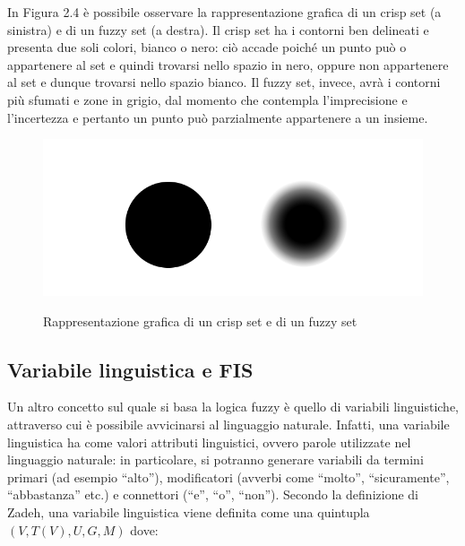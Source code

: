\documentclass[11pt,  oneside, openany]{book}
\begin{document}
In Figura 2.4 è possibile osservare la rappresentazione grafica di un crisp set (a sinistra) e di un fuzzy set (a destra). Il crisp set ha i contorni ben delineati e presenta due soli colori, bianco o nero: ciò accade poiché un punto può o appartenere al set e quindi trovarsi nello spazio in nero, oppure non appartenere al set e dunque trovarsi nello spazio bianco. Il fuzzy set, invece, avrà i contorni più sfumati e zone in grigio, dal momento che contempla l'imprecisione e l'incertezza e pertanto un punto può parzialmente appartenere a un insieme. 

\begin{figure}[h!]
\begin{center}
  \includegraphics[width=13cm]{Immagini/fuzzyvscrisp.png}\\
  \caption{Rappresentazione grafica di un crisp set e di un fuzzy set}
\end{center}
\end{figure}



\subsection{Variabile linguistica e FIS}


Un altro concetto sul quale si basa la logica fuzzy è quello di variabili linguistiche, attraverso cui è possibile avvicinarsi al linguaggio naturale. Infatti, una variabile linguistica ha come valori attributi linguistici, ovvero parole utilizzate nel linguaggio naturale: in particolare, si potranno generare variabili da termini primari (ad esempio ``alto''), modificatori (avverbi come ``molto'', ``sicuramente'', ``abbastanza'' etc.)  e connettori (``e'', ``o'', ``non''). Secondo la definizione di Zadeh, una variabile linguistica viene definita come una quintupla $(V, T(V), U, G, M)$ dove: 
\end{document}
